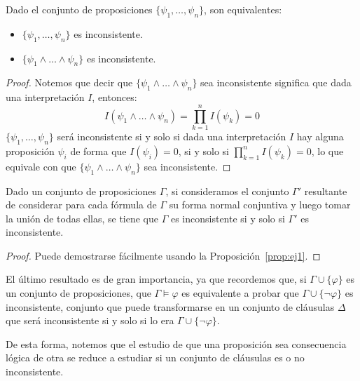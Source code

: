 \begin{prop}\label{prop:ej1}
    Dado el conjunto de proposiciones $\{\psi_1,\ldots,\psi_n\}$, son equivalentes:
    \begin{itemize}
        \item $\{\psi_1,\ldots,\psi_n\}$ es inconsistente.
        \item $\{\psi_1\land\ldots\land\psi_n\}$ es inconsistente.
    \end{itemize}
    \begin{proof}
        Notemos que decir que $\{\psi_1\land \ldots \land \psi_n\}$ sea inconsistente significa que dada una interpretación $I$, entonces:
        \begin{equation*}
            I(\psi_1\land \ldots \land \psi_n) = \prod_{k=1}^{n}I(\psi_k) = 0
        \end{equation*}
        $\{\psi_1,\ldots,\psi_n\}$ será inconsistente si y solo si dada una interpretación $I$ hay alguna proposición $\psi_i$ de forma que $I(\psi_i)=0$, si y solo si $\prod_{k=1}^{n}I(\psi_k)=0$, lo que equivale con que $\{\psi_1\land\ldots\land\psi_n\}$ sea inconsistente.
    \end{proof}
\end{prop}

\begin{prop}
    Dado un conjunto de proposiciones $\Gamma$, si consideramos el conjunto $\Gamma'$ resultante de considerar para cada fórmula de $\Gamma$ su forma normal conjuntiva y luego tomar la unión de todas ellas, se tiene que $\Gamma$ es inconsistente si y solo si $\Gamma'$ es inconsistente.
    \begin{proof}
        Puede demostrarse fácilmente usando la Proposición~\ref{prop:ej1}.
    \end{proof}
\end{prop}

El último resultado es de gran importancia, ya que recordemos que, si $\Gamma\cup\{\varphi\}$ es un conjunto de proposiciones, que $\Gamma\vDash\varphi$ es equivalente a probar que $\Gamma\cup\{\lnot\varphi\}$ es inconsistente, conjunto que puede transformarse en un conjunto de cláusulas $\Delta$ que será inconsistente si y solo si lo era $\Gamma\cup\{\lnot\varphi\}$.

De esta forma, notemos que el estudio de que una proposición sea consecuencia lógica de otra se reduce a estudiar si un conjunto de cláusulas es o no inconsistente.

